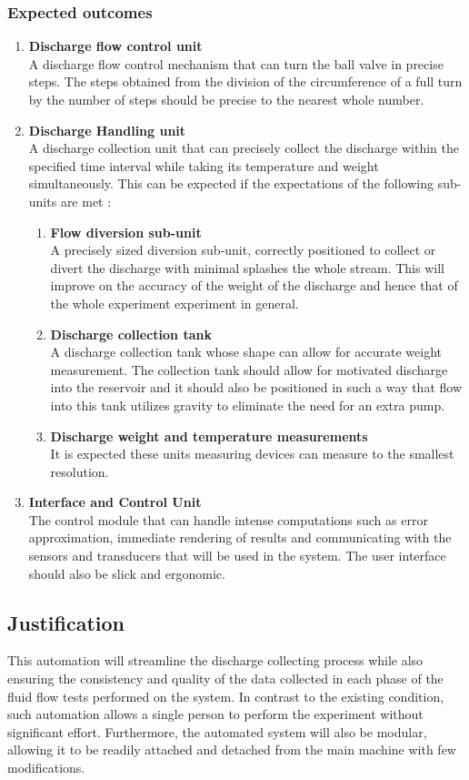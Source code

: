 \subsubsection{Expected outcomes}
\begin{enumerate}
    \item \textbf{Discharge flow control unit}\\
    A discharge flow control mechanism that can turn the ball valve in precise steps. The steps obtained from the division of the circumference of a full turn by the number of steps should be precise to the nearest whole number.
    \item \textbf{Discharge Handling unit}\\
    A discharge collection unit that can precisely collect the discharge within the specified time interval while taking its temperature and weight simultaneously. This can be expected if the expectations of the following sub-units are met :
    \begin{enumerate}
        \item \textbf{Flow diversion sub-unit}\\
        A precisely sized diversion sub-unit, correctly positioned to collect or divert the discharge with minimal splashes the whole stream. This will improve on the accuracy of the weight of the discharge and hence that of the whole experiment experiment in general.
        \item \textbf{Discharge collection tank}\\
        A discharge collection tank whose shape can allow for accurate weight measurement. The collection tank should allow for motivated discharge into the reservoir and it should also be positioned in such a way that flow into this tank utilizes gravity to eliminate the need for an extra pump.
        \item \textbf{Discharge weight and temperature measurements}\\
        It is expected these units measuring devices can measure to the smallest resolution.
    \end{enumerate}
    \item \textbf{Interface and Control Unit}\\
    The control module that can handle intense computations such as error approximation, immediate rendering of results and communicating with the sensors and transducers that will be used in the system. The user interface should also be slick and ergonomic.
\end{enumerate}

\subsection{Justification}
This automation will streamline the discharge collecting process while also ensuring the consistency and quality of the data collected in each phase of the fluid flow tests performed on the system. In contrast to the existing condition, such automation allows a single person to perform the experiment without significant effort. Furthermore, the automated system will also be modular, allowing it to be readily attached and detached from the main machine with few modifications.
